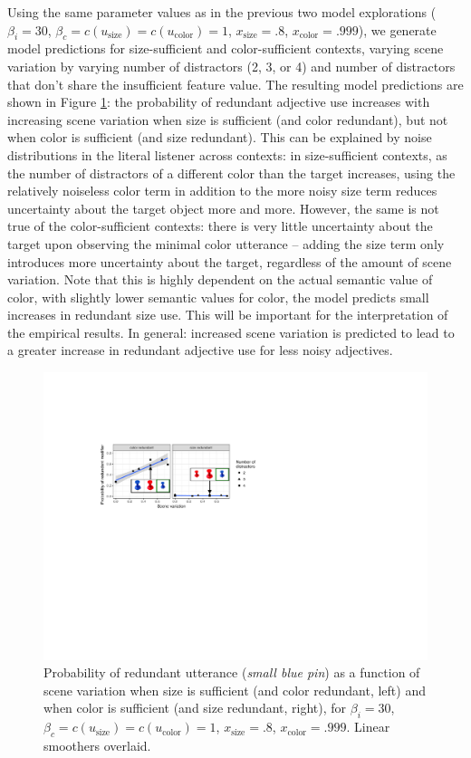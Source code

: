\documentclass[11pt]{article}
\newcommand{\figref}[1]{Figure \ref{#1}}
\begin{document}
Using the same parameter values as in the previous two model explorations ($\beta_i = 30$, $ \beta_c = c(u_{\textrm{size}}) = c(u_{\textrm{color}}) = 1$, $x_{\text{size}} = .8$, $x_{\text{color}} = .999$), we generate model predictions for size-sufficient and color-sufficient contexts, varying scene variation by varying number of distractors (2, 3, or 4) and number of distractors that don't share the insufficient feature value. The resulting model predictions are shown in \figref{fig:numdistractors}: the probability of redundant adjective use increases with increasing scene variation when size is sufficient (and color redundant), but not when color is sufficient (and size redundant). This can be explained by noise distributions in the literal listener across contexts: in size-sufficient contexts, as the number of distractors of a different color than the target increases, using the relatively noiseless color term in addition to the more noisy size term reduces uncertainty about the target object more and more. However, the same is not true of the color-sufficient contexts: there is very little uncertainty about the target upon observing the minimal color utterance -- adding the size term only introduces more uncertainty about the target, regardless of the amount of scene variation. Note that this is highly dependent on the actual semantic value of color, with slightly lower semantic values for color, the model predicts small increases in redundant size use. This will be important for the interpretation of the empirical results. In general: increased scene variation is predicted to lead to a greater increase in redundant adjective use for less noisy adjectives.

\begin{figure}
\centering
\includegraphics[width=.9\textwidth]{pics/scenevariation-annotation}
\caption{Probability of redundant utterance (\emph{small blue pin}) as a function of scene variation when size is sufficient (and color redundant, left) and when color is sufficient (and size redundant, right), for $\beta_i = 30$, $ \beta_c = c(u_{\textrm{size}}) = c(u_{\textrm{color}}) = 1$, $x_{\text{size}} = .8$, $x_{\text{color}} = .999$. Linear smoothers overlaid.}
\label{fig:numdistractors}
\end{figure}
\end{document}
